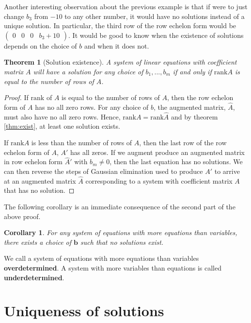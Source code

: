 \documentclass[12pt,reqno]{amsart}
\newcommand{\rank}{\mathrm{rank}}
\newtheorem{theorem}{Theorem}[section]
\newtheorem{corollary}{Corollary}[section]
\theoremstyle{definition}
\begin{document}
Another interesting observation about the previous example is that if
were to just change $b_3$ from $-10$ to any other number, it would have
no solutions instead of a unique solution. In particular, the third
row of the row echelon form would be $\begin{pmatrix} 0 & 0 & 0 & b_3
  + 10 \end{pmatrix}$.  It would be good to know when the existence
of solutions depends on the choice of $b$ and when it does not.
\begin{theorem}[Solution existence]\label{thm:sexist}
  A system of linear equations with coefficient matrix $A$ will have a
  solution for any choice of $b_1, ..., b_m$ if and only if $\rank A$
  is equal to the number of rows of $A$.
\end{theorem}
\begin{proof}
  If $\rank$ of $A$ is equal to the number of rows of $A$, then the
  row echelon form of $A$ has no all zero rows. For any choice of $b$,
  the augmented matrix, $\hat{A}$, must also have no all zero
  rows. Hence, $\rank A = \rank \hat{A}$ and by theorem
  \ref{thm:exist}, at least one solution exists. 

  If $\rank A$ is less than the number of rows of $A$, then the last
  row of the row echelon form of $A$, $A'$ has all zeros. If we
  augment produce an augmented matrix in row echelon form $\hat{A}'$
  with $b_m \neq 0$, then the last equation has no solutions. We can
  then reverse the steps of Gaussian elimination used to produce $A'$
  to arrive at an augmented matrix $\hat{A}$ corresponding to a system
  with coefficient matrix $A$ that has no solution. 
\end{proof}
The following corollary is an immediate consequence of the second part
of the above proof.
\begin{corollary}
  For any system of equations with more equations than variables,
  there exists a choice of $\textbf{b}$ such that no solutions exist. 
\end{corollary}
We call a system of equations with more equations than variables
\textbf{overdetermined}. A system with more variables than equations
is called \textbf{underdetermined}. 

\section{Uniqueness of solutions}
\end{document}
